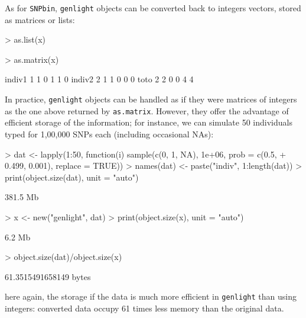 \documentclass{article}
\begin{document}
As for \texttt{SNPbin}, \texttt{genlight} objects can be converted back to integers vectors, stored
as matrices or lists:
\begin{Schunk}
\begin{Sinput}
> as.list(x)
\end{Sinput}
\begin{Sinput}
> as.matrix(x)
\end{Sinput}
\begin{Soutput}
       [,1] [,2] [,3] [,4] [,5] [,6]
indiv1    1    1    0    1    1    0
indiv2    2    1    1    0    0    0
toto      2    2    0    0    4    4
\end{Soutput}
\end{Schunk}

\noindent In practice, \texttt{genlight} objects can be handled as if they were matrices of integers
as the one above returned by \texttt{as.matrix}.
However, they offer the advantage of efficient storage of the information; for instance, we can
simulate 50 individuals typed for 1,00,000 SNPs each (including occasional NAs):
\begin{Schunk}
\begin{Sinput}
> dat <- lapply(1:50, function(i) sample(c(0, 1, NA), 1e+06, prob = c(0.5, 
+     0.499, 0.001), replace = TRUE))
> names(dat) <- paste("indiv", 1:length(dat))
> print(object.size(dat), unit = "auto")
\end{Sinput}
\begin{Soutput}
381.5 Mb
\end{Soutput}
\begin{Sinput}
> x <- new("genlight", dat)
> print(object.size(x), unit = "auto")
\end{Sinput}
\begin{Soutput}
6.2 Mb
\end{Soutput}
\begin{Sinput}
> object.size(dat)/object.size(x)
\end{Sinput}
\begin{Soutput}
61.3515491658149 bytes
\end{Soutput}
\end{Schunk}
here again, the storage if the data is much more efficient in \texttt{genlight} than using integers: converted data occupy
61 times less memory than the original data.
\\
\end{document}

